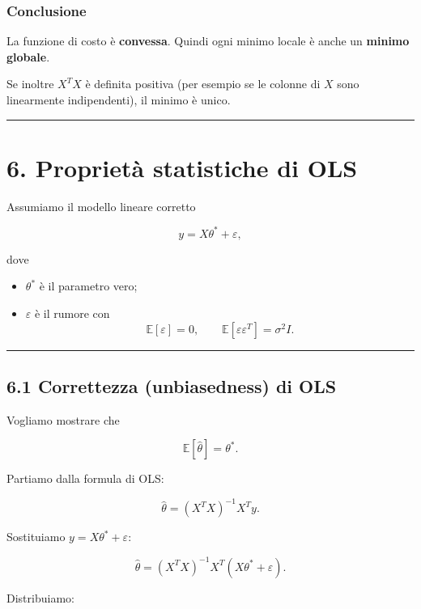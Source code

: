 \documentclass[
]{article}
\providecommand{\tightlist}{%
  \setlength{\itemsep}{0pt}\setlength{\parskip}{0pt}}
\begin{document}
\subsubsection{Conclusione}\label{conclusione-3}

La funzione di costo è \textbf{convessa}. Quindi ogni minimo locale è
anche un \textbf{minimo globale}.

Se inoltre \(X^TX\) è definita positiva (per esempio se le colonne di
\(X\) sono linearmente indipendenti), il minimo è unico.

\begin{center}\rule{0.5\linewidth}{0.5pt}\end{center}

\section{6. Proprietà statistiche di
OLS}\label{proprietuxe0-statistiche-di-ols}

Assumiamo il modello lineare corretto

\[
y = X\theta^* + \varepsilon,
\]

dove

\begin{itemize}
\tightlist
\item
  \(\theta^*\) è il parametro vero;
\item
  \(\varepsilon\) è il rumore con \[
  \mathbb{E}[\varepsilon]=0,\qquad \mathbb{E}[\varepsilon\varepsilon^T]=\sigma^2 I.
  \]
\end{itemize}

\begin{center}\rule{0.5\linewidth}{0.5pt}\end{center}

\subsection{6.1 Correttezza (unbiasedness) di
OLS}\label{correttezza-unbiasedness-di-ols}

Vogliamo mostrare che

\[
\mathbb{E}[\hat\theta]=\theta^*.
\]

Partiamo dalla formula di OLS:

\[
\hat\theta=(X^TX)^{-1}X^Ty.
\]

Sostituiamo \(y=X\theta^*+\varepsilon\):

\[
\hat\theta=(X^TX)^{-1}X^T(X\theta^*+\varepsilon).
\]

Distribuiamo:
\end{document}
